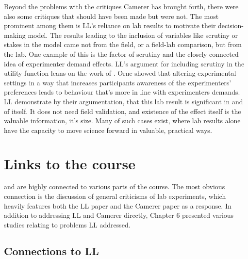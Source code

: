 \documentclass{article}
\begin{document}
Beyond the problems with the critiques Camerer has brought forth, there were also some critiques that should have been made but were not. The most prominent among them is LL’s reliance on lab results to motivate their decision-making model. The results leading to the inclusion of variables like scrutiny or stakes in the model came not from the field, or a field-lab comparison, but from the lab. 
One example of this is the factor of scrutiny and the closely connected idea of experimenter demand effects. LL’s argument for including scrutiny in the utility function leans on the work of \cite{orne1959demand, orne1959nature, orne19621962}. Orne showed that altering experimental settings in a way that increases participants awareness of the experimenters’ preferences leads to behaviour that’s more in line with experimenters demands. 
LL demonstrate by their argumentation, that this lab result is significant in and of itself. It does not need field validation, and existence of the effect itself is the valuable information, it’s size. Many of such cases exist, where lab results alone have the capacity to move science forward in valuable, practical ways.



\section*{Links to the course}

\citet{Camerer.2011} and \citet{Levitt.2007} are highly connected to various parts of the course. The most obvious connection is the discussion of general criticisms of lab experiments, which heavily features both the LL paper and the Camerer paper as a response. In addition to addressing LL and Camerer directly, Chapter 6 presented various studies relating to problems LL addressed. 

\subsection*{Connections to LL}
\end{document}
